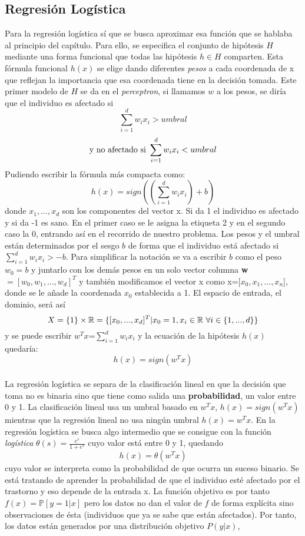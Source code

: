 \subsection{Regresión Logística}\label{st:reglog}
Para la regresión logística sí que se busca aproximar esa función que se hablaba al principio del capítulo. Para ello, se especifica el conjunto de hipótesis $H$ mediante una forma funcional que todas las hipótesis $h \in H$  comparten. Esta fórmula funcional $h(x)$ se elige dando diferentes \textit{pesos} a cada coordenada de x que reflejan la importancia que esa coordenada tiene en la decisión tomada. Este primer modelo de $H$ se da en el \textit{perceptron}, si llamamos $w$ a los pesos, se diría que el individuo es afectado si \[ \sum_{i=1}^{d}w_{i}x_{i} > umbral \]
\[ \textnormal{y no afectado si } \sum_{i=1}^{d}w_{i}x_{i} < umbral \]
Pudiendo escribir la fórmula más compacta como:
\[ h(x)=sign((\sum_{i=1}^{d}w_{i}x_{i})+b) \]
donde $x_{1},...,x_{d}$ son los componentes del vector x. Si da 1 el individuo es afectado y si da -1 es sano. En el primer caso se le asigna la etiqueta 2 y en el segundo caso la 0, entrando así en el recorrido de nuestro problema. Los pesos y el umbral están determinados por el sesgo $b$ de forma que el individuo está afectado si $\sum_{i=1}^{d} w_{i}x_{i} > -b$. Para simplificar la notación se va a escribir $b$ como el peso $w_{0}=b$ y juntarlo con los demás pesos en un solo vector columna \textbf{w}$=[w_{0},w_{1},...,w_{d}]^{T}$ y también modificamos el vector x como x=[$x_{0},x_{1},...,x_{n}$], donde se le añade la coordenada $x_{0}$ establecida a 1. El espacio de entrada, el dominio, será así
\[ X = \lbrace 1 \rbrace \times \mathbb{R} = \lbrace [x_{0},...,x_{d}]^{T} \vert x_{0}=1, x_{i} \in \mathbb{R} \textnormal{ } \forall i \in \lbrace 1,...,d \rbrace \rbrace\]
y se puede escribir \textbf{$w^{T}x$}=$\sum_{i=1}^{d} w_{i}x_{i}$ y la ecuación de la hipótesis $h(x)$ quedaría:
\[ h(x) = sign(w^{T}x) \]
\cite{abu2012learning}\\
La regresión logística se separa de la clasificación lineal en que la decisión que toma no es binaria sino que tiene como salida una \textbf{probabilidad}, un valor entre 0 y 1. La clasificación lineal usa un umbral basado en $w^{T}x$, $h(x) = sign(w^{T}x)$ mientras que la regresión lineal no usa ningún umbral $h(x) =w^{T}x$. En la regresión logística se busca algo intermedio que se consigue con la función \textit{logística} $\theta(s)=\frac{e^{s}}{1+e^{s}}$ cuyo valor está entre 0 y 1, quedando \[ h(x)=\theta(w^{T}x) \] cuyo valor se interpreta como la probabilidad de que ocurra un suceso binario. Se está tratando de aprender la probabilidad de que el individuo esté afectado por el trastorno y eso depende de la entrada x. La función objetivo es por tanto $f(x)= \mathbb{P} [y=1 \vert x]$ pero los datos no dan el valor de $f$ de forma explícita sino observaciones de ésta (individuos que ya se sabe que están afectados). Por tanto, los datos están generados por una distribución objetivo $P(y \vert x)$,
